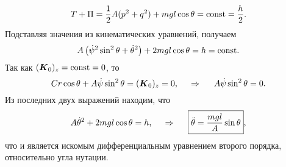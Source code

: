 \begin{equation*}
    T + \Pi = \frac{1}{2} A (p^2 + q^2) + mgl \cos \theta = \text{const} = \frac{h}{2}.
\end{equation*}
Подставляя значения из кинематических уравнений, получаем
\begin{equation}
    A \left(
        \dot{\psi}^2 \sin^2 \theta + \dot{\theta}^2
    \right) + 2mgl \cos \theta = h = \text{const}.
\end{equation}
Так как $(\mbox{\boldmath $K$}_0)_z = \text{const} = 0$, то 
\begin{equation*}
    C r \cos \theta + A \dot{\psi} \sin^2 \theta = (\mbox{\boldmath $K$}_0)_z = 0,
    \hspace{0.5cm} \Rightarrow \hspace{0.5cm} 
    A \dot{\psi} \sin^2 \theta = 0.
\end{equation*}
Из последних двух выражений находим, что
\begin{equation}
    A \dot{\theta}^2 + 2 mgl \cos \theta = h,
    \hspace{0.5cm} \Rightarrow \hspace{0.5cm} 
    \boxed{
        \ddot{\theta} = \frac{mgl}{A} \sin \theta
    },
\end{equation}
что и является искомым дифференциальным уравнением второго порядка, относительно угла нутации.

